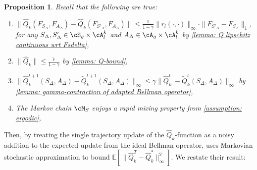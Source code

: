 \documentclass{article}
\theoremstyle{plain}
\newtheorem{proposition}[theorem]{Proposition}
\theoremstyle{definition}
\def\E{\mathbb{E}}
\begin{document}
\begin{proposition}\label{fake assumptions}
    Recall that the following are true:
    \begin{enumerate}
        \item $\|\hat{Q}_k(F_{S_\Delta},F_{A_\Delta}) - \hat{Q}_k(F_{S'_\Delta},F_{A_\Delta})\| \leq \frac{1}{1-\gamma}\|r_l(\cdot,\cdot)\|_\infty \cdot \|F_{S'_\Delta}-F_{S_\Delta}\|_1$, for any $S_\Delta,S'_\Delta \in \cS_g\times\cA_l^k$ and $A_\Delta\in \cA_g\times\cA_l^k$ by \cref{lemma: Q lipschitz continuous wrt Fsdelta},
        \item $\|\hat{Q}_k\| \leq \frac{\tilde{r}}{1-\gamma}$ by \cref{lemma: Q-bound},
        \item $\|\hat{Q}^{t+1}_k(S_\Delta,A_\Delta) - \tilde{Q}_k^{t+1}(S_\Delta,A_\Delta)\|_\infty \leq \gamma\|\hat{Q}_k^t\ - \tilde{Q}_k^t(S_\Delta,A_\Delta)\|_\infty$ by \cref{lemma: gamma-contraction of adapted Bellman operator},
        \item The Markov chain $\cM_S$ enjoys a rapid mixing property from \cref{assumption: ergodic},
    \end{enumerate}
\end{proposition}

Then, by treating the single trajectory update of the $\hat{Q}_k$-function as a noisy addition to the expected update from the ideal Bellman operator, \cite{chen2021lyapunov} uses Markovian stochastic approximation to bound $\E[\|\hat{Q}_k^T - \hat{Q}_k^*\|_\infty^2]$. We restate their result:\\
\end{document}
